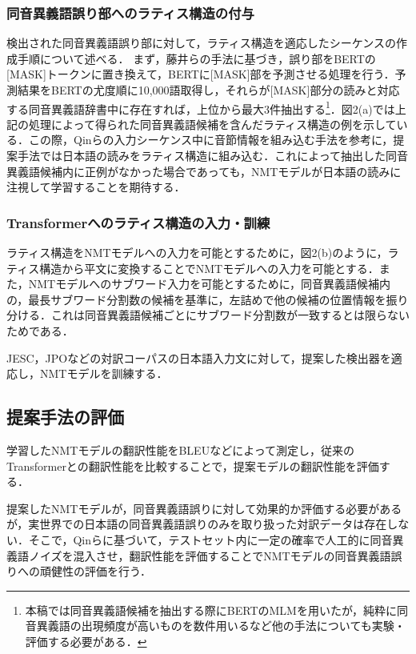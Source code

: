 \documentclass[a4j,10.5pt, twocolumn]{jarticle}
\begin{document}
\subsubsection{同音異義語誤り部へのラティス構造の付与}
検出された同音異義語誤り部に対して，ラティス構造を適応したシーケンスの作成手順について述べる．
まず，藤井ら\cite{Fujii}の手法に基づき，誤り部をBERTの[MASK]トークンに置き換えて，BERTに[MASK]部を予測させる処理を行う．予測結果をBERTの尤度順に10,000語取得し，それらが[MASK]部分の読みと対応する同音異義語辞書中に存在すれば，上位から最大3件抽出する\footnote{本稿では同音異義語候補を抽出する際にBERTのMLMを用いたが，純粋に同音異義語の出現頻度が高いものを数件用いるなど他の手法についても実験・評価する必要がある．}．図2(a)では上記の処理によって得られた同音異義語候補を含んだラティス構造の例を示している．この際，Qinら\cite{Qin}の入力シーケンス中に音節情報を組み込む手法を参考に，提案手法では日本語の読みをラティス構造に組み込む．これによって抽出した同音異義語候補内に正例がなかった場合であっても，NMTモデルが日本語の読みに注視して学習することを期待する．

\subsubsection{Transformerへのラティス構造の入力・訓練}
ラティス構造をNMTモデルへの入力を可能とするために，図2(b)のように，ラティス構造から平文に変換することでNMTモデルへの入力を可能とする．また，NMTモデルへのサブワード入力を可能とするために，同音異義語候補内の，最長サブワード分割数の候補を基準に，左詰めで他の候補の位置情報を振り分ける．これは同音異義語候補ごとにサブワード分割数が一致するとは限らないためである．

JESC，JPOなどの対訳コーパスの日本語入力文に対して，提案した検出器を適応し，NMTモデルを訓練する．

\subsection{提案手法の評価}
学習したNMTモデルの翻訳性能をBLEUなどによって測定し，従来のTransformerとの翻訳性能を比較することで，提案モデルの翻訳性能を評価する．

提案したNMTモデルが，同音異義語誤りに対して効果的か評価する必要があるが，実世界での日本語の同音異義語誤りのみを取り扱った対訳データは存在しない．そこで，Qinら\cite{Qin}に基づいて，テストセット内に一定の確率で人工的に同音異義語ノイズを混入させ，翻訳性能を評価することでNMTモデルの同音異義語誤りへの頑健性の評価を行う．
\end{document}
